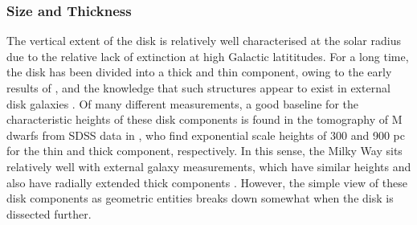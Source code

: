 \subsubsection{Size and Thickness}
\label{sec:disksize}
The vertical extent of the disk is relatively well characterised at the solar radius due to the relative lack of extinction at high Galactic latititudes. For a long time, the disk has been divided into a thick and thin component, owing to the early results of \citet{1983MNRAS.202.1025G}, and the knowledge that such structures appear to exist in external disk galaxies \citep[e.g.][]{1979ApJ...234..829B,1979ApJ...234..842T,2006AJ....131..226Y}. Of many different measurements, a good baseline for the characteristic heights of these disk components is found in the tomography of M dwarfs from SDSS data in \citet{2008ApJ...673..864J}, who find exponential scale heights of 300 and 900 pc for the thin and thick component, respectively. In this sense, the Milky Way sits relatively well with external galaxy measurements, which have similar heights and also have radially extended thick components \citep[e.g][]{2006AJ....131..226Y}. However, the simple view of these disk components as geometric entities breaks down somewhat when the disk is dissected further.

